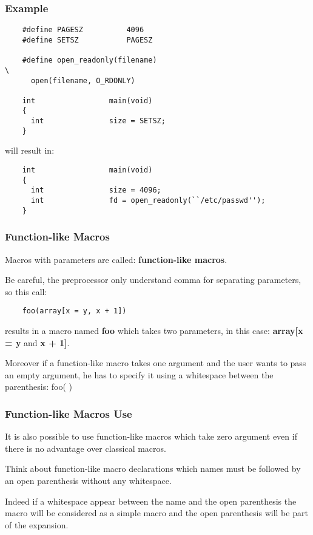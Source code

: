 \begin{frame}[containsverbatim]
  \frametitle{Example}

  \begin{verbatim}
    #define PAGESZ          4096
    #define SETSZ           PAGESZ

    #define open_readonly(filename)                                     \
      open(filename, O_RDONLY)

    int                 main(void)
    {
      int               size = SETSZ;
    }
  \end{verbatim}

  will result in:

  \begin{verbatim}
    int                 main(void)
    {
      int               size = 4096;
      int               fd = open_readonly(``/etc/passwd'');
    }
  \end{verbatim}
\end{frame}


\begin{frame}[containsverbatim]
  \frametitle{Function-like Macros}

  Macros with parameters are called: \textbf{function-like macros}.

  \nl

  Be careful, the preprocessor only understand comma for separating parameters,
  so this call:

  \begin{verbatim}
    foo(array[x = y, x + 1])
  \end{verbatim}

  results in a macro named \textbf{foo} which takes two parameters,
  in this case: \textbf{array[x = y} and \textbf{x + 1]}.

  \nl

  Moreover if a function-like macro takes one argument and the user
  wants to pass an empty argument, he has to specify it using a
  whitespace between the parenthesis: foo( )
\end{frame}


\begin{frame}
  \frametitle{Function-like Macros Use}

  It is also possible to use function-like macros which take zero argument
  even if there is no advantage over classical macros.

  \nl

  Think about function-like macro declarations which names \alert{must} be
  followed by an open parenthesis without any whitespace.

  \nl

  Indeed if a whitespace appear between the name and the open parenthesis
  the macro will be considered as a simple macro and the open parenthesis
  will be part of the expansion.
\end{frame}

